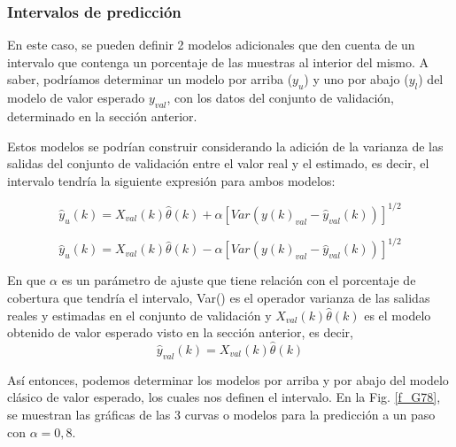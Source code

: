 \documentclass[12pt]{article}
\begin{document}
\clearpage
\newpage
\subsubsection{Intervalos de predicción}
En este caso, se pueden definir 2 modelos adicionales que den cuenta de un intervalo que contenga un porcentaje de las muestras al interior del mismo. A saber, podríamos determinar un modelo por arriba ($y_u$) y uno por abajo ($y_l$) del modelo de valor esperado $y_{val}$, con los datos del conjunto de validación, determinado en la sección anterior.

Estos modelos se podrían construir considerando la adición de la varianza de las salidas del conjunto de validación entre el valor real y el estimado, es decir, el intervalo tendría la siguiente expresión para ambos modelos:

\begin{equation}
\hat{y}_u(k)=X_{val}(k)\hat{\theta}(k)+\alpha[Var(y(k)_{val}-\hat{y}_{val}(k))]^{1/2}
\label{e_MLocal_G}
\end{equation}

\begin{equation}
\hat{y}_u(k)=X_{val}(k)\hat{\theta}(k)-\alpha[Var(y(k)_{val}-\hat{y}_{val}(k))]^{1/2}
\label{e_MLocal2_G}
\end{equation}

En que $\alpha$ es un parámetro de ajuste que tiene relación con el porcentaje de cobertura que tendría el intervalo, Var() es el operador varianza de las salidas reales y estimadas en el conjunto de validación y $X_{val}(k)\hat{\theta}(k)$ es el modelo obtenido de valor esperado visto en la sección anterior, es decir,
\begin{equation}
\hat{y}_{val}(k)=X_{val}(k)\hat{\theta}(k)
\end{equation}

Así entonces, podemos determinar los modelos por arriba y por abajo del modelo clásico de valor esperado, los cuales nos definen el intervalo. En la Fig. \ref{f_G78}, se muestran las gráficas de las 3 curvas o modelos para la predicción a un paso con $\alpha=0,8$.
\end{document}
